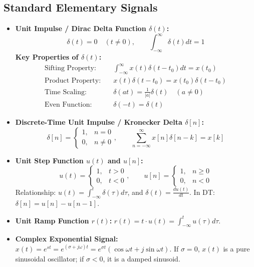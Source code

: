 \documentclass[12pt,a4paper]{article}
\begin{document}
\subsection{Standard Elementary Signals}
\begin{itemize}[leftmargin=*, itemsep=4pt]
  \item \textbf{Unit Impulse / Dirac Delta Function $\delta(t)$:}
  \begin{equation}
    \delta(t) = 0 \quad (t \ne 0), \qquad \int_{-\infty}^{\infty} \delta(t) dt = 1
  \end{equation}
  \textbf{Key Properties of $\delta(t)$:}
  \begin{align}
    \text{Sifting Property:} \quad &\int_{-\infty}^{\infty} x(t) \delta(t - t_0) dt = x(t_0) \\
    \text{Product Property:} \quad &x(t) \delta(t - t_0) = x(t_0) \delta(t - t_0) \\
    \text{Time Scaling:} \quad &\delta(a t) = \frac{1}{|a|} \delta(t) \quad (a \ne 0) \\
    \text{Even Function:} \quad &\delta(-t) = \delta(t)
  \end{align}
  \item \textbf{Discrete-Time Unit Impulse / Kronecker Delta $\delta[n]$:}
  \begin{equation}
    \delta[n] = \begin{cases} 1, & n = 0 \\ 0, & n \ne 0 \end{cases}, \qquad \sum_{n=-\infty}^{\infty} x[n] \delta[n - k] = x[k]
  \end{equation}
  \item \textbf{Unit Step Function $u(t)$ and $u[n]$:}
  \begin{equation}
    u(t) = \begin{cases} 1, & t > 0 \\ 0, & t < 0 \end{cases}, \qquad u[n] = \begin{cases} 1, & n \ge 0 \\ 0, & n < 0 \end{cases}
  \end{equation}
  Relationship: $u(t) = \int_{-\infty}^{t} \delta(\tau) d\tau$, and $\delta(t) = \frac{du(t)}{dt}$. In DT: $\delta[n] = u[n] - u[n-1]$.
  \item \textbf{Unit Ramp Function $r(t)$:} $r(t) = t \cdot u(t) = \int_{-\infty}^t u(\tau) d\tau$.
  \item \textbf{Complex Exponential Signal:} $x(t) = e^{s t} = e^{(\sigma + j\omega)t} = e^{\sigma t}(\cos\omega t + j\sin\omega t)$.
  If $\sigma = 0$, $x(t)$ is a pure sinusoidal oscillator; if $\sigma < 0$, it is a damped sinusoid.
\end{itemize}
\end{document}
